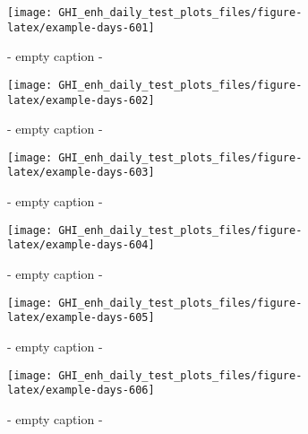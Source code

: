 \documentclass[
  10pt,
  a4paper,oneside]{article}
\begin{document}
\begin{figure}[H]

{\centering \texttt{[image: GHI\_enh\_daily\_test\_plots\_files/figure-latex/example-days-601]} 

}

\caption{ - empty caption - }\label{fig:example-days-601}
\end{figure}

\begin{figure}[H]

{\centering \texttt{[image: GHI\_enh\_daily\_test\_plots\_files/figure-latex/example-days-602]} 

}

\caption{ - empty caption - }\label{fig:example-days-602}
\end{figure}

\begin{figure}[H]

{\centering \texttt{[image: GHI\_enh\_daily\_test\_plots\_files/figure-latex/example-days-603]} 

}

\caption{ - empty caption - }\label{fig:example-days-603}
\end{figure}

\begin{figure}[H]

{\centering \texttt{[image: GHI\_enh\_daily\_test\_plots\_files/figure-latex/example-days-604]} 

}

\caption{ - empty caption - }\label{fig:example-days-604}
\end{figure}

\begin{figure}[H]

{\centering \texttt{[image: GHI\_enh\_daily\_test\_plots\_files/figure-latex/example-days-605]} 

}

\caption{ - empty caption - }\label{fig:example-days-605}
\end{figure}

\begin{figure}[H]

{\centering \texttt{[image: GHI\_enh\_daily\_test\_plots\_files/figure-latex/example-days-606]} 

}

\caption{ - empty caption - }\label{fig:example-days-606}
\end{figure}
\end{document}
